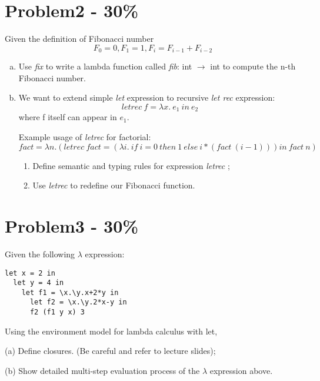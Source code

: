 \documentclass{article}
\begin{document}
\section*{Problem2 - 30\%}

Given the definition of Fibonacci number
\[F_0 = 0, F_1 = 1, F_i = F_{i-1} + F_{i-2}\]
\begin{enumerate}[(a)]
\item Use \textit{fix} to write a lambda function called \textit{fib}: int $\rightarrow$ int to compute the n-th Fibonacci number.
\item We want to extend simple \textit{let} expression to recursive \textit{let rec} expression:
\[letrec\ f = \lambda x.\ e_{1}\ in\ e_{2}\]
where f itself can appear in $e_{1}$. 

Example usage of \textit{letrec} for factorial:
\[fact = \lambda n. (letrec\ fact= (\lambda i.\ if\ i=0\ then\ 1\ else\ i*(fact\ (i-1))) in\ fact\ n)\]

\begin{enumerate}[(1)]
\item Define semantic and typing rules for expression \textit{letrec} ;
\item Use \textit{letrec} to redefine our Fibonacci function.

\end{enumerate}

\end{enumerate}

\section*{Problem3 - 30\%}

Given the following $\lambda$ expression:
\begin{verbatim}
let x = 2 in
  let y = 4 in
    let f1 = \x.\y.x+2*y in
      let f2 = \x.\y.2*x-y in
      f2 (f1 y x) 3
\end{verbatim}

Using the environment model for lambda calculus with let,
    
(a) Define closures. (Be careful and refer to lecture slides);
 
(b) Show detailed multi-step evaluation process of the $\lambda$ expression above.
\end{document}
